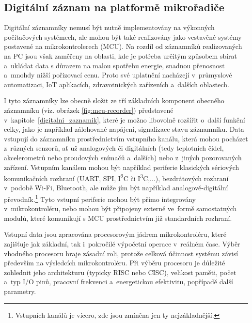 \subsection{Digitální záznam na platformě mikrořadiče}
\label{digitalni_zaznamnik_mikroradic}
Digitální záznamníky nemusí být nutně implementovány na výkonných počítačových systémech, ale mohou být také realizovány jako vestavěné systémy postavené na mikrokontrolerech (MCU). Na rozdíl od záznamníků realizovaných na PC jsou však zaměřeny na oblasti, kde je potřeba určitým způsobem sbírat a~ukládat data s důrazem na malou spotřebu energie, snadnou přenosnost a~mnohdy nižší pořizovací cenu. Proto své uplatnění nacházejí v~průmyslové automatizaci, IoT aplikacích, zdravotnických zařízeních a~dalších oblastech.~\cite{iot_datalogger_with_timestamping, researchgate_general_dataloggger_multiple_sdcards}

I tyto záznamníky lze obecně složit ze tří základních komponent obecného záznamníku (viz. obrázek \ref{fig:mcu-recorder}) představené v~kapitole~\ref{digitalni_zaznamik}, které je možno libovolně rozšířit o~další funkční celky, jako je například zálohované napájení, signalizace stavu záznamníku. Data vstupují do záznamníku prostřednictvím vstupního kanálu, která mohou pocházet z~různých senzorů, ať už analogových či digitálních (tedy teplotních čidel, akcelerometrů nebo proudových snímačů a~dalších) nebo z~jiných pozorovaných zařízení. Vstupním kanálem mohou být například periferie klasických sériových komunikačních rozhraní (UART, SPI, I\textsuperscript{2}C či I\textsuperscript{3}C,...), bezdrátových rozhraní v~podobě Wi-Fi, Bluetooth, ale může jím být například analogově-digitální převodník.\footnote{Vstupních kanálů je vícero, zde jsou zmíněna jen ty nejzákladnější.} Tyto vstupní periferie mohou být přímo integrovány v~mikrokontroléru, nebo mohou být připojeny externě ve~formě samostatných modulů, které komunikují s MCU prostřednictvím již standardních rozhraní.~\cite{ieee_digital_sound_recorder_arm_sd_card}

Vstupní data jsou zpracována procesorovým jádrem mikrokontroléru, které zajišťuje jak základní, tak i~pokročilé výpočetní operace v~reálném čase. Výběr vhodného procesoru hraje zásadní roli, protože celková účinnost systému závisí především na výsledcích mikrokontroléru. Při výběru procesoru je důležité zohlednit jeho architekturu (typicky RISC nebo CISC), velikost paměti, počet a~typ I/O pinů, pracovní frekvenci a~energetickou efektivitu, popřípadě další parametry.~\cite{smart_datalogger_data_acquisition_cpu, ieee_digital_sound_recorder_arm_sd_card}

